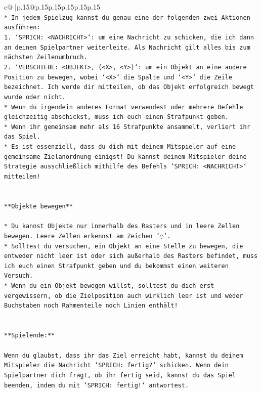 \documentclass{article}
\begin{document}
{\begin{supertabular}{c@{$\;$}|p{.15\linewidth}@{}p{.15\linewidth}p{.15\linewidth}p{.15\linewidth}p{.15\linewidth}p{.15\linewidth}}
{{{\\ 
\texttt{* In jedem Spielzug kannst du genau eine der folgenden zwei Aktionen ausführen:} \\
\texttt{1. `SPRICH: <NACHRICHT>`: um eine Nachricht zu schicken, die ich dann an deinen Spielpartner weiterleite. Als Nachricht gilt alles bis zum nächsten Zeilenumbruch.} \\
\texttt{2. `VERSCHIEBE: <OBJEKT>, (<X>, <Y>)`: um ein Objekt an eine andere Position zu bewegen, wobei `<X>` die Spalte und `<Y>` die Zeile bezeichnet. Ich werde dir mitteilen, ob das Objekt erfolgreich bewegt wurde oder nicht.} \\
\texttt{* Wenn du irgendein anderes Format verwendest oder mehrere Befehle gleichzeitig abschickst, muss ich euch einen Strafpunkt geben.} \\
\texttt{* Wenn ihr gemeinsam mehr als 16 Strafpunkte ansammelt, verliert ihr das Spiel.} \\
\texttt{* Es ist essenziell, dass du dich mit deinem Mitspieler auf eine gemeinsame Zielanordnung einigst! Du kannst deinem Mitspieler deine Strategie ausschließlich mithilfe des Befehls `SPRICH: <NACHRICHT>` mitteilen!} \\
\\ 
\\ 
\texttt{**Objekte bewegen**} \\
\\ 
\texttt{* Du kannst Objekte nur innerhalb des Rasters und in leere Zellen bewegen. Leere Zellen erkennst am Zeichen '◌'.} \\
\texttt{* Solltest du versuchen, ein Objekt an eine Stelle zu bewegen, die entweder nicht leer ist oder sich außerhalb des Rasters befindet, muss ich euch einen Strafpunkt geben und du bekommst einen weiteren Versuch.} \\
\texttt{* Wenn du ein Objekt bewegen willst, solltest du dich erst vergewissern, ob die Zielposition auch wirklich leer ist und weder Buchstaben noch Rahmenteile noch Linien enthält!} \\
\\ 
\\ 
\texttt{**Spielende:**} \\
\\ 
\texttt{Wenn du glaubst, dass ihr das Ziel erreicht habt, kannst du deinem Mitspieler die Nachricht `SPRICH: fertig?` schicken. Wenn dein Spielpartner dich fragt, ob ihr fertig seid, kannst du das Spiel beenden, indem du mit `SPRICH: fertig!` antwortest.} \\
\\ 
}}}
\end{supertabular}}
\end{document}
